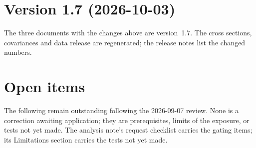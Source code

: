\section{Version 1.7 (2026-10-03)}

The three documents with the changes above are version~1.7. The cross sections, covariances and data release are
regenerated; the release notes list the changed numbers.

\section{Open items}

The following remain outstanding following the 2026-09-07 review. None is a correction awaiting application;
they are prerequisites, limits of the exposure, or tests not yet made. The analysis note's
request checklist carries the gating items; its Limitations section carries the tests not
yet made.

